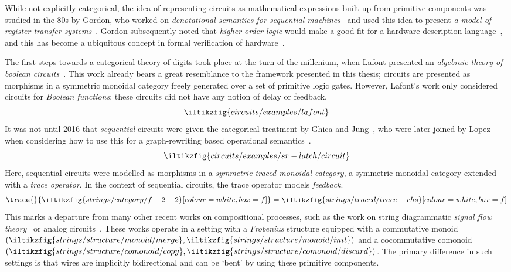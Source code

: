 While not explicitly categorical, the idea of representing circuits as
mathematical expressions built up from primitive components was studied in the
80s by Gordon, who worked on
\emph{denotational semantics for sequential machines}~\cite{gordon1980denotational}
and used this idea to present
\emph{a model of register transfer systems}~\cite{gordon1982model}.
Gordon subsequently noted that \emph{higher order logic} would make a good fit
for a hardware description language~\cite{gordon1985why}, and this has become
a ubiquitous concept in formal verification of hardware~\cite{gupta1992formal}.

The first steps towards a categorical theory of digits took place at the turn of
the millenium, when Lafont presented an
\emph{algebraic theory of boolean circuits}~\cite{lafont2003algebraic}.
This work already bears a great resemblance to the framework presented in this
thesis; circuits
are presented as morphisms in a symmetric monoidal category freely generated
over a set of primitive logic gates.
However, Lafont's work only considered circuits for \emph{Boolean functions};
these circuits did not have any notion of delay or feedback.
\[
    \iltikzfig{circuits/examples/lafont}
\]
It was not until 2016 that \emph{sequential} circuits were given the
categorical treatment by Ghica and Jung~\cite{ghica2016categorical}, who were
later joined by Lopez when considering how to use this for a graph-rewriting
based operational semantics~\cite{ghica2017diagrammatic}.
\[
    \iltikzfig{circuits/examples/sr-latch/circuit}
\]
Here, sequential circuits were modelled as morphisms in a
\emph{symmetric traced monoidal category}, a symmetric monoidal category
extended with a \emph{trace operator}.
In the context of sequential circuits, the trace operator models
\emph{feedback}.
\[
    \trace{}{
        \iltikzfig{strings/category/f-2-2}[colour=white,box=f]
    }
    =
    \iltikzfig{strings/traced/trace-rhs}[colour=white,box=f]
\]
This marks a departure from many other recent works on compositional processes,
such as the work on string diagrammatic
\emph{signal flow theory}~\cite{bonchi2021survey} or analog
circuits~\cite{boisseau2022string}.
These works operate in a setting with a \emph{Frobenius} structure equipped with
a commutative monoid \((
\iltikzfig{strings/structure/monoid/merge},
\iltikzfig{strings/structure/monoid/init}
)\) and a cocommutative comonoid \((
\iltikzfig{strings/structure/comonoid/copy},
\iltikzfig{strings/structure/comonoid/discard}
)\).
The primary difference in such settings is that wires are implicitly
bidirectional and can be `bent' by using these primitive components.
